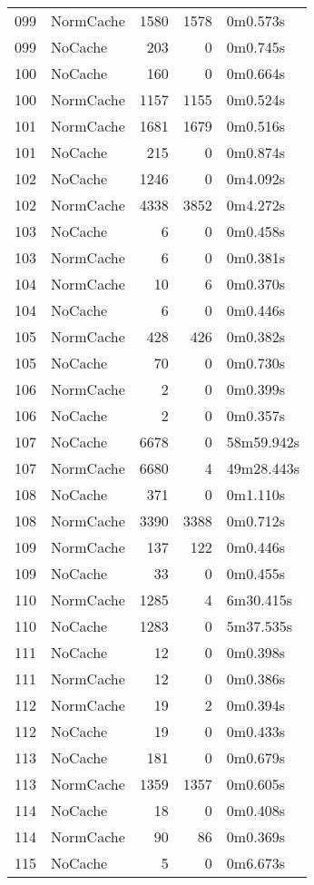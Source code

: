 \begin{tabular}{llrrl}
099 & NormCache & 1580 & 1578 & 0m0.573s \\
099 & NoCache & 203 & 0 & 0m0.745s \\
100 & NoCache & 160 & 0 & 0m0.664s \\
100 & NormCache & 1157 & 1155 & 0m0.524s \\
101 & NormCache & 1681 & 1679 & 0m0.516s \\
101 & NoCache & 215 & 0 & 0m0.874s \\
102 & NoCache & 1246 & 0 & 0m4.092s \\
102 & NormCache & 4338 & 3852 & 0m4.272s \\
103 & NoCache & 6 & 0 & 0m0.458s \\
103 & NormCache & 6 & 0 & 0m0.381s \\
104 & NormCache & 10 & 6 & 0m0.370s \\
104 & NoCache & 6 & 0 & 0m0.446s \\
105 & NormCache & 428 & 426 & 0m0.382s \\
105 & NoCache & 70 & 0 & 0m0.730s \\
106 & NormCache & 2 & 0 & 0m0.399s \\
106 & NoCache & 2 & 0 & 0m0.357s \\
107 & NoCache & 6678 & 0 & 58m59.942s \\
107 & NormCache & 6680 & 4 & 49m28.443s \\
108 & NoCache & 371 & 0 & 0m1.110s \\
108 & NormCache & 3390 & 3388 & 0m0.712s \\
109 & NormCache & 137 & 122 & 0m0.446s \\
109 & NoCache & 33 & 0 & 0m0.455s \\
110 & NormCache & 1285 & 4 & 6m30.415s \\
110 & NoCache & 1283 & 0 & 5m37.535s \\
111 & NoCache & 12 & 0 & 0m0.398s \\
111 & NormCache & 12 & 0 & 0m0.386s \\
112 & NormCache & 19 & 2 & 0m0.394s \\
112 & NoCache & 19 & 0 & 0m0.433s \\
113 & NoCache & 181 & 0 & 0m0.679s \\
113 & NormCache & 1359 & 1357 & 0m0.605s \\
114 & NoCache & 18 & 0 & 0m0.408s \\
114 & NormCache & 90 & 86 & 0m0.369s \\
115 & NoCache & 5 & 0 & 0m6.673s \\

\end{tabular}

